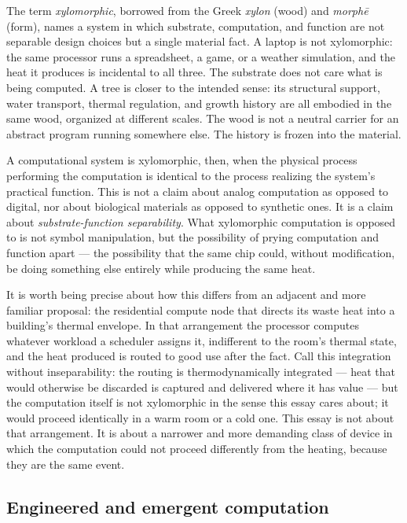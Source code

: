 \documentclass[11pt]{article}
\begin{document}
The term \emph{xylomorphic}, borrowed from the Greek \textit{xylon} (wood) and \textit{morph\={e}} (form), names a system in which substrate, computation, and function are not separable design choices but a single material fact. A laptop is not xylomorphic: the same processor runs a spreadsheet, a game, or a weather simulation, and the heat it produces is incidental to all three. The substrate does not care what is being computed. A tree is closer to the intended sense: its structural support, water transport, thermal regulation, and growth history are all embodied in the same wood, organized at different scales. The wood is not a neutral carrier for an abstract program running somewhere else. The history is frozen into the material.

A computational system is xylomorphic, then, when the physical process performing the computation is identical to the process realizing the system's practical function. This is not a claim about analog computation as opposed to digital, nor about biological materials as opposed to synthetic ones. It is a claim about \emph{substrate-function separability}. What xylomorphic computation is opposed to is not symbol manipulation, but the possibility of prying computation and function apart --- the possibility that the same chip could, without modification, be doing something else entirely while producing the same heat.

It is worth being precise about how this differs from an adjacent and more familiar proposal: the residential compute node that directs its waste heat into a building's thermal envelope. In that arrangement the processor computes whatever workload a scheduler assigns it, indifferent to the room's thermal state, and the heat produced is routed to good use after the fact. Call this integration without inseparability: the routing is thermodynamically integrated --- heat that would otherwise be discarded is captured and delivered where it has value --- but the computation itself is not xylomorphic in the sense this essay cares about; it would proceed identically in a warm room or a cold one. This essay is not about that arrangement. It is about a narrower and more demanding class of device in which the computation could not proceed differently from the heating, because they are the same event.

\subsection{Engineered and emergent computation}
\end{document}
